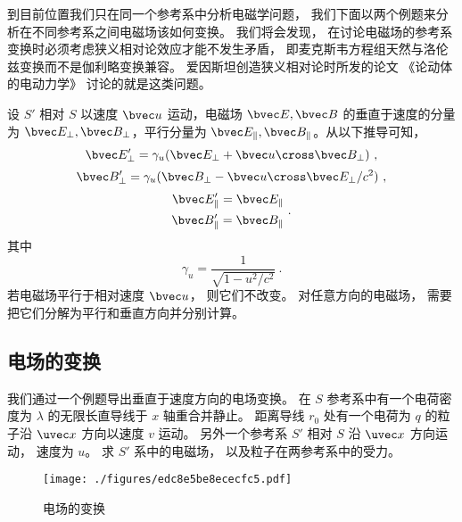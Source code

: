 
\begin{issues}
\issueTODO
{}
\end{issues}


到目前位置我们只在同一个参考系中分析电磁学问题， 我们下面以两个例题来分析在不同参考系之间电磁场该如何变换。 我们将会发现， 在讨论电磁场的参考系变换时必须考虑狭义相对论效应才能不发生矛盾， 即麦克斯韦方程组天然与洛伦兹变换而不是伽利略变换兼容。 爱因斯坦创造狭义相对论时所发的论文 《论动体的电动力学》 讨论的就是这类问题。

设 $S'$ 相对 $S$ 以速度 $\bvec u$ 运动，电磁场 $\bvec E, \bvec B$ 的垂直于速度的分量为 $\bvec E_\perp, \bvec B_\perp$，平行分量为 $\bvec E_\parallel, \bvec B_\parallel$。从以下推导可知，
\begin{equation}\label{eq_EMRef_1}
\bvec E_\perp' = \gamma_u (\bvec E_\perp + \bvec u \cross \bvec B_\perp)~,
\end{equation}
\begin{equation}\label{eq_EMRef_2}
\bvec B_\perp' = \gamma_u (\bvec B_\perp - \bvec u \cross \bvec E_\perp/c^2)~,
\end{equation}
\begin{equation}
\begin{aligned}
\bvec E_\parallel' =\bvec E_\parallel\\ 
\bvec B_\parallel' =\bvec B_\parallel
\end{aligned}~.
\end{equation}
其中
\begin{equation}
\gamma_u = \frac{1}{\sqrt{1 - u^2/c^2}}~.
\end{equation}
若电磁场平行于相对速度 $\bvec u$， 则它们不改变。 对任意方向的电磁场， 需要把它们分解为平行和垂直方向并分别计算。

\subsection{电场的变换}
我们通过一个例题导出垂直于速度方向的电场变换。 在 $S$ 参考系中有一个电荷密度为 $\lambda$ 的无限长直导线于 $x$ 轴重合并静止。 距离导线 $r_0$ 处有一个电荷为 $q$ 的粒子沿 $\uvec x$ 方向以速度 $v$ 运动。 另外一个参考系 $S'$ 相对 $S$ 沿 $\uvec x$ 方向运动， 速度为 $u$。 求 $S'$ 系中的电磁场， 以及粒子在两参考系中的受力。
\begin{figure}[ht]
\centering
\texttt{[image: ./figures/edc8e5be8ececfc5.pdf]}
\caption{电场的变换} \label{fig_EMRef_1}
\end{figure}

